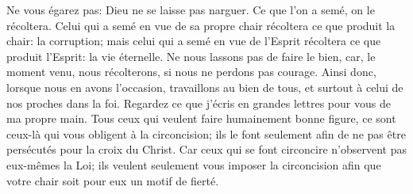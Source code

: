 Ne vous égarez pas: Dieu ne se laisse pas narguer.
	Ce que l’on a semé, on le récoltera.
Celui qui a semé en vue de sa propre chair récoltera ce que produit la chair:
	la corruption;
	mais celui qui a semé en vue de l’Esprit récoltera ce que produit l’Esprit:
	la vie éternelle.
Ne nous lassons pas de faire le bien,
	car, le moment venu, nous récolterons, si nous ne perdons pas courage.
Ainsi donc, lorsque nous en avons l’occasion, travaillons au bien de tous,
	et surtout à celui de nos proches dans la foi.
Regardez ce que j’écris en grandes lettres pour vous de ma propre main.
Tous ceux qui veulent faire humainement bonne figure,
	ce sont ceux-là qui vous obligent à la circoncision;
	ils le font seulement afin de ne pas être persécutés pour la croix du Christ.
Car ceux qui se font circoncire n’observent pas eux-mêmes la Loi;
	ils veulent seulement vous imposer la circoncision
	afin que votre chair soit pour eux un motif de fierté.
